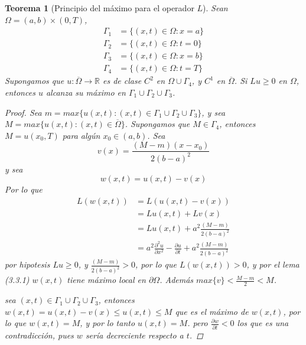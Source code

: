 \documentclass[11pt]{book}
\theoremstyle{plain}
\newtheorem{teo}[proposición]{Teorema}
\theoremstyle{definition}
\newcommand{\R}{\mathbb{R}}
\begin{document}
\begin{teo}[Principio del máximo para el operador $L$]
    Sean $\Omega = (a,b)\times(0,T)$, 
    \begin{align*}
        \Gamma_{1} &= \{(x,t) \in \Omega : x = a\}\\
        \Gamma_{2} &= \{(x,t) \in \Omega : t = 0\}\\
        \Gamma_{3} &= \{(x,t) \in \Omega : x = b\}\\
        \Gamma_{4} &= \{(x,t) \in \Omega : t = T\}
    \end{align*}
    Supongamos que $u: \overline{\Omega} \to \R$ es de clase $C^{2}$ en $\Omega\cup\Gamma_{4}$, y $C^{1}$ en $\overline{\Omega}$. Si $Lu \geq 0$ en $\Omega$, entonces $u$ alcanza su máximo en $\Gamma_{1}\cup\Gamma_{2}\cup\Gamma_{3}$.
    \begin{proof}
        Sea $m = max\{u(x,t) : (x,t) \in \Gamma_{1}\cup\Gamma_{2}\cup\Gamma_{3}\}$, y sea $M = max\{u(x,t) : (x,t) \in \overline{\Omega}\}$. Supongamos que $M \in \Gamma_{4}$, entonces $M = u(x_{0},T)$ para algún $x_{0} \in (a,b)$. Sea
        \[
        v(x) = \frac{(M-m) (x-x_{0})}{2(b-a)^{2}}    
        \]    
        y sea
        \[
        w(x,t) = u(x,t) - v(x)
        \]
        Por lo que
        \begin{align*}
            L(w(x,t)) &= L(u(x,t) - v(x))\\
            &= Lu(x,t) + Lv(x)\\
            &= Lu(x,t) + a^{2}\frac{(M-m)}{2(b-a)^{2}}\\
            &= a^{2} \frac{\partial^2 u}{\partial x^2} - \frac{\partial u}{\partial t} + a^{2}\frac{(M-m)}{2(b-a)^{2}}
        \end{align*}
        por hipotesis $Lu \geq 0$, y $\frac{(M-m)}{2(b-a)^{2}} > 0$, por lo que $L(w(x,t)) > 0$, y por el lema (3.3.1) $w(x,t)$ tiene máximo local en $\partial \Omega$. Además $max\{v\} < \frac{M-m}{2} < M$.

        sea $(x,t) \in \Gamma_{1}\cup\Gamma_{2}\cup\Gamma_{3}$, entonces $w(x,t) = u(x,t) - v(x) \leq u(x,t) \leq M$ que es el máximo de $w(x,t)$, por lo que $w(x,t) = M$, y por lo tanto $u(x,t) = M$.
        pero $\frac{\partial w}{\partial t} < 0$ los que es una contradicción, pues $w$ sería decreciente respecto a $t$.
    \end{proof}
\end{teo}
\end{document}
